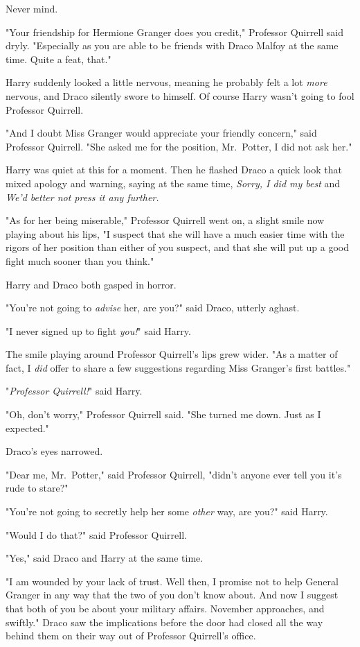 Never mind.

"Your friendship for Hermione Granger does you credit," Professor Quirrell said 
dryly. "Especially as you are able to be friends with Draco Malfoy at the same 
time. Quite a feat, that."

Harry suddenly looked a little nervous, meaning he probably felt a lot 
\emph{more} nervous, and Draco silently swore to himself. Of course Harry 
wasn't going to fool Professor Quirrell.

"And I doubt Miss Granger would appreciate your friendly concern," said 
Professor Quirrell. "She asked me for the position, Mr.~Potter, I did not ask 
her."

Harry was quiet at this for a moment. Then he flashed Draco a quick look that 
mixed apology and warning, saying at the same time, \emph{Sorry, I did my best} 
and \emph{We'd better not press it any further.}

"As for her being miserable," Professor Quirrell went on, a slight smile now 
playing about his lips, "I suspect that she will have a much easier time with 
the rigors of her position than either of you suspect, and that she will put up 
a good fight much sooner than you think."

Harry and Draco both gasped in horror.

"You're not going to \emph{advise} her, are you?" said Draco, utterly aghast.

"I never signed up to fight \emph{you!}" said Harry.

The smile playing around Professor Quirrell's lips grew wider. "As a matter of 
fact, I \emph{did} offer to share a few suggestions regarding Miss Granger's 
first battles."

"\emph{Professor Quirrell!}" said Harry.

"Oh, don't worry," Professor Quirrell said. "She turned me down. Just as I 
expected."

Draco's eyes narrowed.

"Dear me, Mr.~Potter," said Professor Quirrell, "didn't anyone ever tell you 
it's rude to stare?"

"You're not going to secretly help her some \emph{other} way, are you?" said 
Harry.

"Would I do that?" said Professor Quirrell.

"Yes," said Draco and Harry at the same time.

"I am wounded by your lack of trust. Well then, I promise not to help General 
Granger in any way that the two of you don't know about. And now I suggest that 
both of you be about your military affairs. November approaches, and swiftly."
\sbreak
Draco saw the implications before the door had closed all the way behind them 
on their way out of Professor Quirrell's office.

